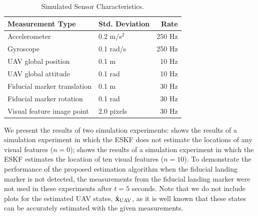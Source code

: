 \begin{table}[h!]
  \begin{center}
    \caption{Simulated Sensor Characteristics.}
    \label{tab:sim_meas_noise}
    \begin{tabular}{l|l|r}
      \textbf{Measurement Type} & \textbf{Std. Deviation} & \textbf{Rate} \\
      \hline
      Accelerometer & 0.2 m/s$^2$ & 250 Hz \\
      Gyroscope & 0.1 rad/s & 250 Hz \\
      UAV global position & 0.1 m & 10 Hz \\
      UAV global attitude & 0.1 rad & 10 Hz \\
      Fiducial marker translation & 0.1 m & 30 Hz \\
      Fiducial marker rotation & 0.1 rad & 30 Hz \\
      Visual feature image point & 2.0 pixels & 30 Hz \\
    \end{tabular}
  \end{center}
\end{table}

We present the results of two simulation experiments:
 shows the results of a simulation experiment in which the ESKF
does not estimate the locations of any visual features ($n = 0$);
 shows the results of a simulation experiment in which
the ESKF estimates the location of ten visual features ($n = 10$).
To demonstrate the performance of the proposed estimation algorithm when the
fiducial landing marker is not detected, the measurements from the fiducial
landing marker were not used in these experiments after $t = 5$
seconds.
Note that we
do not include plots for the estimated UAV states, $\hat{\boldsymbol{\mathrm{x}}}_{\text{UAV}}$,
as it is well known that these states can be accurately estimated with the given
measurements.

